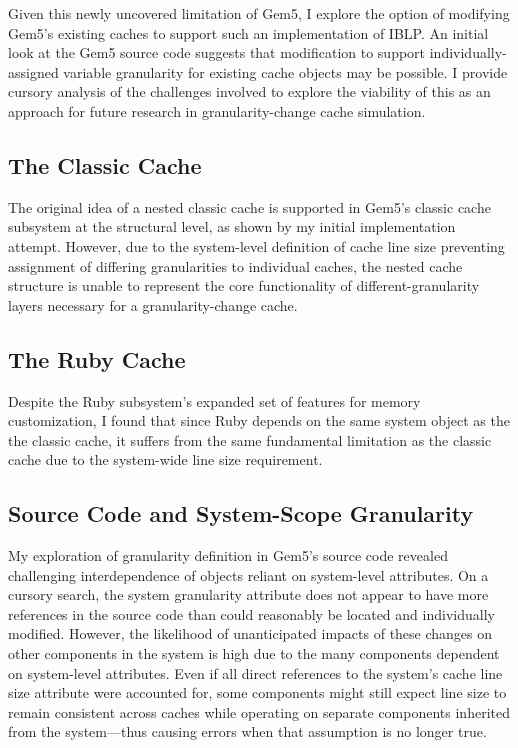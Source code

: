 \documentclass[12pt,twoside]{reedthesis}
\begin{document}
	Given this newly uncovered limitation of Gem5, I explore the option of modifying Gem5's existing caches to support such an implementation of IBLP. An initial look at the Gem5 source code suggests that modification to support individually-assigned variable granularity for existing cache objects may be possible. I provide cursory analysis of the challenges involved to explore the viability of this as an approach for future research in granularity-change cache simulation.

	\subsection*{The Classic Cache}

	The original idea of a nested classic cache is supported in Gem5's classic cache subsystem at the structural level, as shown by my initial implementation attempt. However, due to the system-level definition of cache line size preventing assignment of differing granularities to individual caches, the nested cache structure is unable to represent the core functionality of different-granularity layers necessary for a granularity-change cache.

	\subsection*{The Ruby Cache}

	Despite the Ruby subsystem's expanded set of features for memory customization, I found that since Ruby depends on the same system object as the the classic cache, it suffers from the same fundamental limitation as the classic cache due to the system-wide line size requirement.

	\subsection*{Source Code and System-Scope Granularity}

	My exploration of granularity definition in Gem5's source code revealed challenging interdependence of objects reliant on system-level attributes. On a cursory search, the system granularity attribute does not appear to have more references in the source code than could reasonably be located and individually modified. However, the likelihood of unanticipated impacts of these changes on other components in the system is high due to the many components dependent on system-level attributes. Even if all direct references to the system's cache line size attribute were accounted for, some components might still expect line size to remain consistent across caches while operating on separate components inherited from the system---thus causing errors when that assumption is no longer true.
\end{document}

